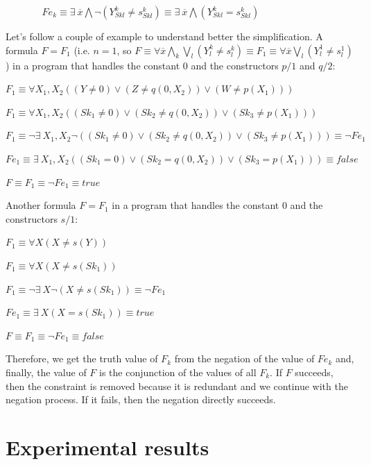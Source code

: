 \documentclass{tlp}
\begin{document}
$~~~~~~~~~~~~~~~~~  Fe_k  \equiv \exists ~ \overline{x} \bigwedge \neg (Y_{Sk l}^k \neq s_{Sk l}^k)  \equiv \exists ~ \overline{x} \bigwedge (Y_{Sk l}^k = s_{Sk l}^k)  $

Let's follow a couple of example to understand better the simplification. A formula $F=F_1$ (i.e. $n=1$, so $F \equiv \forall \overline{x} \bigwedge_k\bigvee_l (Y_l^k \neq s_l^k) \equiv F_1 \equiv \forall \overline{x} \bigvee_l (Y_l^1 \neq s_l^1)$) in a program that handles the constant $0$ and the constructors $p/1$ and $q/2$:

$ F_1 \equiv \forall X_1, X_2 ((Y \neq 0) \vee (Z \neq q(0,X_2)) \vee (W \neq p(X_1)))$ 

$ F_1 \equiv \forall X_1, X_2 ((Sk_1 \neq 0) \vee (Sk_2 \neq q(0,X_2)) \vee (Sk_3 \neq p(X_1))) $

$ F_1 \equiv \neg \exists ~ X_1, X_2  \neg ((Sk_1 \neq 0) \vee (Sk_2 \neq q(0,X_2)) \vee (Sk_3 \neq p(X_1))) \equiv \neg Fe_1$

$ Fe_1 \equiv \exists ~ X_1, X_2  ((Sk_1 = 0) \vee (Sk_2 = q(0,X_2)) \vee (Sk_3 = p(X_1))) \equiv false$

$ F \equiv F_1 \equiv \neg Fe_1 \equiv true$

Another formula $F=F_1$ in a program that handles the constant $0$ and the constructors $s/1$:

$ F_1 \equiv \forall X (X \neq s(Y))$ 

$ F_1 \equiv \forall X (X \neq s(Sk_1))$

$ F_1 \equiv \neg \exists ~ X  \neg  (X \neq s(Sk_1)) \equiv \neg Fe_1$

$ Fe_1 \equiv \exists ~ X  (X = s(Sk_1)) \equiv true$

$ F \equiv F_1 \equiv \neg Fe_1 \equiv false$
  
        Therefore, we get the truth value of $F_k$ from the
        negation of the value of $Fe_k$ and, finally, the value of $F$ is
        the conjunction of the values of all $F_k$. If $F$
        succeeds, then the constraint is removed because it is redundant
        and we continue with the negation process. If it fails, then
        the negation directly succeeds.


\section{Experimental results}
\label{results}
\end{document}
